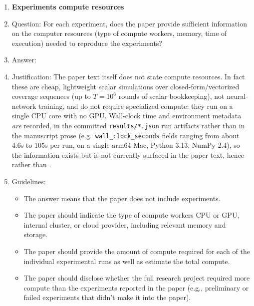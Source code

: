 \begin{enumerate}
\item {\bf Experiments compute resources}
    \item[] Question: For each experiment, does the paper provide sufficient information on the computer resources (type of compute workers, memory, time of execution) needed to reproduce the experiments?
    \item[] Answer: \answerNo{}
    \item[] Justification: The paper text itself does not state compute resources. In fact these are cheap, lightweight scalar simulations over closed-form/vectorized coverage sequences (up to $T=10^6$ rounds of scalar bookkeeping), not neural-network training, and do not require specialized compute: they run on a single CPU core with no GPU. Wall-clock time and environment metadata \emph{are} recorded, in the committed \texttt{results/*.json} run artifacts rather than in the manuscript prose (e.g.\ \texttt{wall\_clock\_seconds} fields ranging from about 4.6s to 105s per run, on a single arm64 Mac, Python 3.13, NumPy 2.4), so the information exists but is not currently surfaced in the paper text, hence \answerNo{} rather than \answerYes{}.
    \item[] Guidelines:
    \begin{itemize}
        \item The answer \answerNA{} means that the paper does not include experiments.
        \item The paper should indicate the type of compute workers CPU or GPU, internal cluster, or cloud provider, including relevant memory and storage.
        \item The paper should provide the amount of compute required for each of the individual experimental runs as well as estimate the total compute.
        \item The paper should disclose whether the full research project required more compute than the experiments reported in the paper (e.g., preliminary or failed experiments that didn't make it into the paper).
    \end{itemize}


\end{enumerate}
